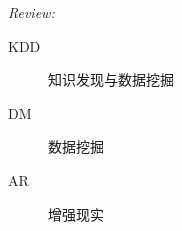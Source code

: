 \textit{Review:}
\begin{description}
    \item[KDD] 知识发现与数据挖掘
    \item [DM] 数据挖掘
    \item [AR] 增强现实
\end{description}
